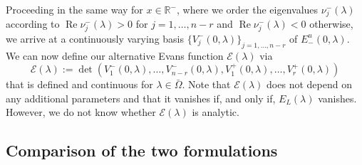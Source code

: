 \documentclass[10pt]{article}
\numberwithin{equation}{section}
\def\Re{\mathop\mathrm{Re}\nolimits}
\newcommand{\R}{\mathbb{R}}
\begin{document}
Proceeding in the same way for $x\in\R^-$, where we order the eigenvalues $\nu^-_j(\lambda)$ according to $\Re\nu^-_j(\lambda)>0$ for $j=1,\ldots,n-r$ and $\Re\nu^-_j(\lambda)<0$ otherwise, we arrive at a continuously varying basis $\{V^-_j(0,\lambda)\}_{j=1,\ldots,n-r}$ of $E^u_-(0,\lambda)$. We can now define our alternative Evans function $\mathcal{E}(\lambda)$ via
\begin{equation}\label{e22}
\mathcal{E}(\lambda) := \det(V_1^-(0,\lambda),\ldots,V_{n-r}^-(0,\lambda),V_1^+(0,\lambda),\ldots,V_r^+(0,\lambda))
\end{equation}
that is defined and continuous for $\lambda\in\bar\Omega$. Note that $\mathcal{E}(\lambda)$ does not depend on any additional parameters and that it vanishes if, and only if, $E_L(\lambda)$ vanishes. However, we do not know whether $\mathcal{E}(\lambda)$ is analytic.


\subsection{Comparison of the two formulations}\label{s2.3}
\end{document}
